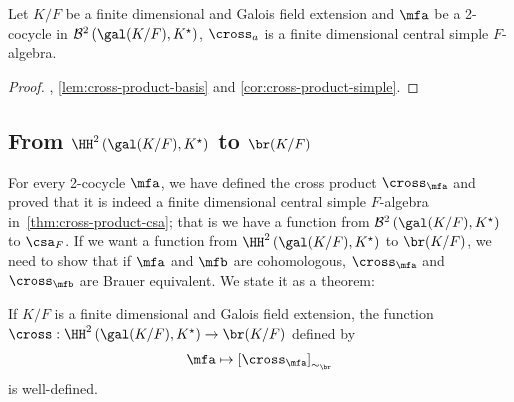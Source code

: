 \begin{theorem}\label{thm:cross-product-csa}
  Let $K/F$ be a finite dimensional and Galois field extension and $\mfa$ be a 2-cocycle in $\mathcal{B}^{2}\left(\gal(K/F), K^{\star}\right)$, $\cross_{a}$ is a finite dimensional central simple $F$-algebra.
  \leanok
\end{theorem}
\begin{proof}
  , \cref{lem:cross-product-basis} and \cref{cor:cross-product-simple}.
\end{proof}

\subsection{From $\HH^{2}\left(\gal(K/F), K^{\star}\right)$ to $\br(K/F)$}

For every 2-cocycle $\mfa$, we have defined the cross product $\cross_{\mfa}$ and proved that it is indeed a finite dimensional central simple $F$-algebra in~\cref{thm:cross-product-csa}; that is we have a function from $\mathcal{B}^{2}\left(\gal(K/F), K^{\star}\right)$ to $\csa_{F}$. If we want a function from $\HH^{2}\left(\gal(K/F), K^{\star}\right)$ to $\br(K/F)$, we need to show that if $\mfa$ and $\mfb$ are cohomologous, $\cross_{\mfa}$ and $\cross_{\mfb}$ are Brauer equivalent. We state it as a theorem:

\begin{theorem}\label{thm:snd-coh-to-relative-br}
  If $K/F$ is a finite dimensional and Galois field extension,
  the function $\cross : \HH^{2}\left(\gal(K/F), K^{\star}\right) \to \br(K/F)$ defined by
  \[
    \mfa \mapsto \left[\cross_{\mfa}\right]_{\sim_{\br}}
  \]
  is well-defined.
  \leanok
\end{theorem}

